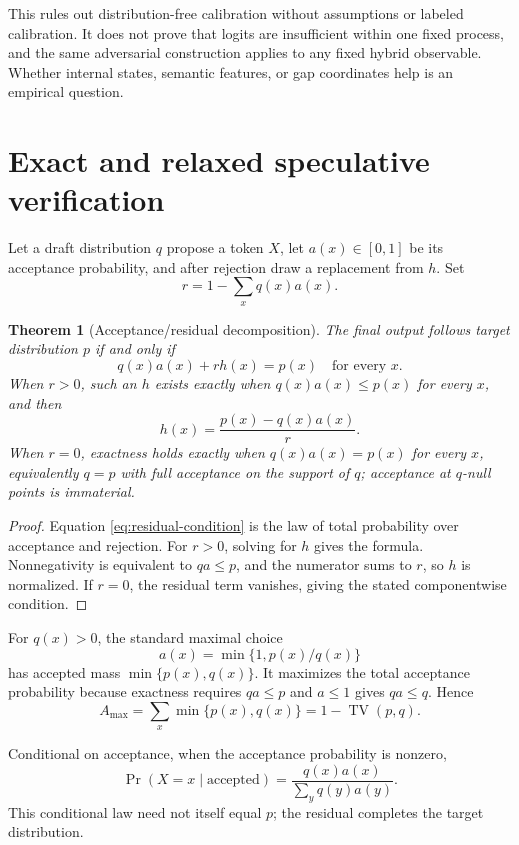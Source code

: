 \documentclass[11pt]{article}
\newtheorem{theorem}{Theorem}[section]
\theoremstyle{definition}
\theoremstyle{remark}
\newcommand{\1}{\mathbf{1}}
\newcommand{\TV}{\operatorname{TV}}
\begin{document}
This rules out distribution-free calibration without assumptions or labeled
calibration.  It does not prove that logits are insufficient within one fixed
process, and the same adversarial construction applies to any fixed hybrid
observable.  Whether internal states, semantic features, or gap coordinates
help is an empirical question.

\section{Exact and relaxed speculative verification}

Let a draft distribution $q$ propose a token $X$, let $a(x)\in[0,1]$ be its
acceptance probability, and after rejection draw a replacement from $h$.  Set
\[
  r=1-\sum_xq(x)a(x).
\]

\begin{theorem}[Acceptance/residual decomposition]\label{thm:residual}
The final output follows target distribution $p$ if and only if
\begin{equation}\label{eq:residual-condition}
  q(x)a(x)+r h(x)=p(x)
  \quad\text{for every }x.
\end{equation}
When $r>0$, such an $h$ exists exactly when $q(x)a(x)\leq p(x)$ for every $x$,
and then
\[
  h(x)=\frac{p(x)-q(x)a(x)}{r}.
\]
When $r=0$, exactness holds exactly when $q(x)a(x)=p(x)$ for every $x$,
equivalently $q=p$ with full acceptance on the support of $q$; acceptance at
$q$-null points is immaterial.
\end{theorem}

\begin{proof}
Equation \eqref{eq:residual-condition} is the law of total probability over
acceptance and rejection.  For $r>0$, solving for $h$ gives the formula.
Nonnegativity is equivalent to $qa\leq p$, and the numerator sums to $r$, so
$h$ is normalized.  If $r=0$, the residual term vanishes, giving the stated
componentwise condition.
\end{proof}

For $q(x)>0$, the standard maximal choice
\[
  a(x)=\min\{1,p(x)/q(x)\}
\]
has accepted mass $\min\{p(x),q(x)\}$.  It maximizes the total acceptance
probability because exactness requires $qa\leq p$ and $a\leq1$ gives
$qa\leq q$.  Hence
\begin{equation}\label{eq:max-acceptance}
  A_{\max}=\sum_x\min\{p(x),q(x)\}=1-\TV(p,q).
\end{equation}

Conditional on acceptance, when the acceptance probability is nonzero,
\[
 \Pr(X=x\mid\text{accepted})
 =\frac{q(x)a(x)}{\sum_yq(y)a(y)}.
\]
This conditional law need not itself equal $p$; the residual completes the
target distribution.
\end{document}
